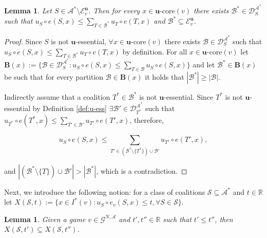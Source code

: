 \documentclass[a4paper,12pt]{article}
\newtheorem{lemma}[theorem]{Lemma}
\theoremstyle{definition}
\theoremstyle{remark}
\begin{document}
\begin{lemma}\label{lemma:rest1}
Let $S \in \mathcal{A}^\ast \setminus \mathcal{E}_v^{\mathbf{u}}$. Then for every $x \in \mathbf{u}\text{-core}(v)$ there exists $\mathcal{B}^\ast \in \mathcal{D}_S^{\mathcal{A}^{\ast}}$ such that $u_S \circ e(S, x) \leq \sum_{T \in \mathcal{B}^\ast} u_T \circ e(T, x)$  and $\mathcal{B}^\ast \subseteq \mathcal{E}_v^{\mathbf{u}}$.
\end{lemma}

\begin{proof}
Since $S$ is not $\mathbf{u}$-essential, $\forall x\in \mathbf{u}\text{-core}(v)$ there exists $\mathcal{B} \in \mathcal{D}_S^{\mathcal{A}^{\ast}}$ such that $u_S \circ e(S, x) \leq \sum_{T \in \mathcal{B}^\ast} u_T \circ e(T, x)$ by definition. For all $x\in \mathbf{u}$-core$(v)$ let $\mathbf{B}(x) := \{ \mathcal{B} \in \mathcal{D}_S^{\mathcal{A}^{\ast}} \colon u_S \circ e(S, x) \leq \sum_{T \in \mathcal{B}} u_S \circ e(S, x) \}$ and let $\mathcal{B}^\ast \in \mathbf{B}(x)$ be such that for every partition $\mathcal{B} \in \mathbf{B}(x)$ it holds that $| \mathcal{B}^\ast | \geq | \mathcal{B} |$.

Indirectly assume that a coalition $T^\ast \in \mathcal{B}^\ast$ is not $\mathbf{u}$-essential. Since $T^*$ is not $\mathbf{u}$-essential by Definition \ref{def:u-ess} $\exists \mathcal{B}' \in\mathcal{D}_{T^\ast}^{\mathcal{A}^{\ast}}$ such that $u_{T^*} \circ e(T^\ast, x)  \leq \sum_{T' \in \mathcal{B}'} u_{T'} \circ e (T', x)$, therefore, 

\begin{equation*}
u_S \circ e(S, x)  \leq \sum_{T' \in (\mathcal{B}^\ast \setminus \{T^\ast\}) \cup \mathcal{B}'} u_{T'} \circ e (T', x),
\end{equation*}

\noindent and $| ( \mathcal{B}^\ast \setminus \{T\}) \cup \mathcal{B}' | > | \mathcal{B}^\ast |$, which is a contradiction.
\end{proof}

Next, we introduce the following notion: for a class of coalitions $\mathcal{S}\subseteq \mathcal{A}^*$ and $t\in \mathbb{R}$ let $X(\mathcal{S}, t):= \{ x\in I^\ast(v) \colon u_S\circ e_v(S, x) \leq t, \forall S\in \mathcal{S} \} $.

\begin{lemma}\label{lemma:X(t')<=X(t")}
Given a game $v\in \mathcal{G}^{N, \mathcal{A}}$ and $t', t'' \in \mathbb{R}$ such that $t'\leq t''$, then $X(\mathcal{S}, t') \subseteq X(\mathcal{S}, t'')$.
\end{lemma}
\end{document}

